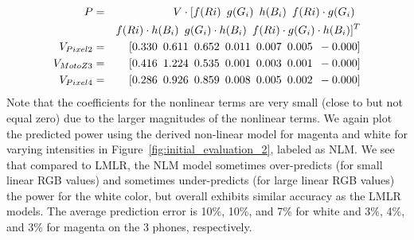 \vspace{-0.1in}
{\small
  \begin{eqnarray}
  P&=&V\cdot [ 
	    f(Ri)\mbox{\hspace{0.07in}}
	    g(G_i)\mbox{\hspace{0.07in}}
	    h(B_i)\mbox{\hspace{0.07in}}
	    f(Ri)\cdot g(G_i)\mbox{\hspace{0.07in}}\\
&&	    f(Ri)\cdot h(B_i)\mbox{\hspace{0.07in}}
	    g(G_i)\cdot h(B_i)\mbox{\hspace{0.07in}}
	    f(Ri)\cdot g(G_i)\cdot h(B_i)
  ]^T
	\nonumber \\
        V_{Pixel 2} &=& \lbrack
	     0.330\mbox{\hspace{0.07in}}
	     0.611\mbox{\hspace{0.07in}}
	     0.652\mbox{\hspace{0.07in}}
	     0.011\mbox{\hspace{0.07in}}
	     0.007\mbox{\hspace{0.07in}}
	     0.005\mbox{\hspace{0.07in}}
	    -0.000
        \rbrack   \nonumber \\
        V_{Moto Z3} &=& \lbrack
	     0.416\mbox{\hspace{0.07in}}
	     1.224\mbox{\hspace{0.07in}}
	     0.535\mbox{\hspace{0.07in}}
	     0.001\mbox{\hspace{0.07in}}
	     0.003\mbox{\hspace{0.07in}}
	     0.001\mbox{\hspace{0.07in}}
	    -0.000
        \rbrack \nonumber  \\
        V_{Pixel 4} &=& \lbrack
	     0.286\mbox{\hspace{0.07in}}
	     0.926\mbox{\hspace{0.07in}}
	     0.859\mbox{\hspace{0.07in}}
	     0.008\mbox{\hspace{0.07in}}
	     0.005\mbox{\hspace{0.07in}}
	     0.002\mbox{\hspace{0.07in}}
	    -0.000
        \rbrack \nonumber 
\end{eqnarray}
}
\noindent
%
Note that the coefficients for the nonlinear terms are very small (close to but not equal zero)
due to the larger magnitudes of the nonlinear terms.
We again plot the predicted power using the derived non-linear model
for magenta and white for varying intensities in
Figure~\ref{fig:initial_evaluation_2}, labeled as NLM.
We see that compared to LMLR, the NLM model 
sometimes over-predicts (for small linear RGB values)
and sometimes under-predicts (for large linear RGB values) the power for the
white color, but overall exhibits similar accuracy as the
LMLR models.
{The average prediction error is
10\%, 10\%, and 7\% for white
and 3\%, 4\%, and 3\% for magenta on the 3 phones, respectively.
}

